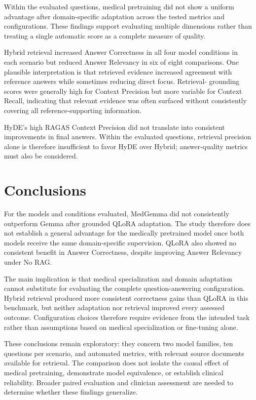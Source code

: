 Within the evaluated questions, medical pretraining did not show a uniform
advantage after domain-specific adaptation across the tested metrics and
configurations. These findings support evaluating multiple
dimensions rather than treating a single automatic score as a complete
measure of quality.

Hybrid retrieval increased Answer Correctness in all four model conditions
in each scenario but reduced Answer Relevancy in six of eight comparisons.
One plausible interpretation is that retrieved evidence increased agreement
with reference answers while sometimes reducing direct focus. Retrieval-
grounding scores were generally high for Context Precision but more variable
for Context Recall, indicating that relevant evidence was often surfaced
without consistently covering all reference-supporting information.

HyDE's high RAGAS Context Precision did not translate into consistent
improvements in final answers. Within the evaluated questions, retrieval
precision alone is therefore insufficient to favor HyDE over Hybrid;
answer-quality metrics must also be considered.

\section{Conclusions}
For the models and conditions evaluated, MedGemma did not consistently
outperform Gemma after grounded QLoRA adaptation. The study therefore does not
establish a general advantage for the medically pretrained model once both
models receive the same domain-specific supervision. QLoRA also showed no
consistent benefit in Answer Correctness, despite improving Answer Relevancy
under No RAG.

The main implication is that medical specialization and domain adaptation
cannot substitute for evaluating the complete question-answering
configuration. Hybrid retrieval produced more consistent correctness gains
than QLoRA in this benchmark, but neither adaptation nor retrieval improved
every assessed outcome. Configuration choices therefore require evidence from
the intended task rather than assumptions based on medical specialization or
fine-tuning alone.

These conclusions remain exploratory: they concern two model families, ten
questions per scenario, and automated metrics, with relevant source documents
available for retrieval. The comparison does not isolate the causal effect of
medical pretraining, demonstrate model equivalence, or establish clinical
reliability. Broader paired evaluation and clinician assessment are needed to
determine whether these findings generalize.
